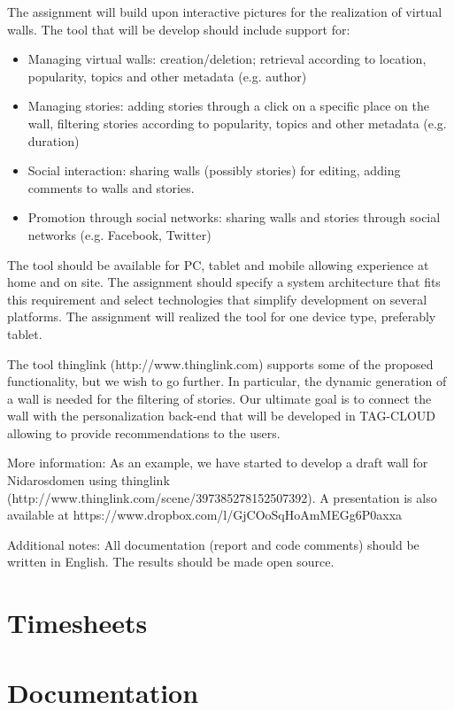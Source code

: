\documentclass[11pt]{book}
\begin{document}
The assignment will build upon interactive pictures for the realization of virtual walls. The tool that will be develop should include support for:
\begin{itemize}
	\item Managing virtual walls: creation/deletion; retrieval according to location, popularity, topics and other metadata (e.g. author)
	\item Managing stories: adding stories through a click on a specific place on the wall, filtering stories
according to popularity, topics and other metadata (e.g. duration)
	\item Social interaction: sharing walls (possibly stories) for editing, adding comments to walls and stories.
	\item Promotion through social networks: sharing walls and stories through social networks (e.g. Facebook, Twitter)
\end{itemize}
The tool should be available for PC, tablet and mobile allowing experience at home and on site. The assignment should specify a system architecture that fits this requirement and select technologies that simplify development on several platforms. The assignment will realized the tool for one device type, preferably tablet.

The tool thinglink (http://www.thinglink.com) supports some of the proposed functionality, but we wish to go further. In particular, the dynamic generation of a wall is needed for the filtering of stories. Our ultimate goal is to connect the wall with the personalization back-end that will be developed in TAG-CLOUD allowing to provide recommendations to the users.

More information: As an example, we have started to develop a draft wall for Nidarosdomen using thinglink (http://www.thinglink.com/scene/397385278152507392). A presentation is also available at https://www.dropbox.com/l/GjCOoSqHoAmMEGg6P0axxa

Additional notes: All documentation (report and code comments) should be written in English. The results should be made open source.

\chapter{Timesheets}

\chapter{Documentation}\label{chap:documentation}
\end{document}
